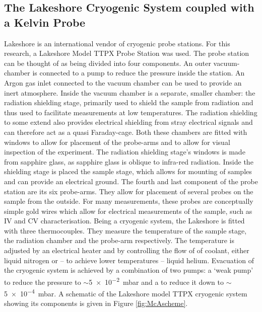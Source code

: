 \subsection{The Lakeshore Cryogenic System coupled with a \McA{} Kelvin Probe}
\label{sec:kpnew}
Lakeshore is an international vendor of cryogenic probe stations. For this research, a Lakeshore Model TTPX Probe Station was used. The probe station can be thought of as being divided into four components. An outer vacuum-chamber is connected to a pump to reduce the pressure inside the station. An Argon gas inlet connected to the vacuum chamber can be used to provide an inert atmosphere. Inside the vacuum chamber is a separate, smaller chamber: the radiation shielding stage, primarily used to shield the sample from \ir{} radiation and thus used to facilitate measurements at low temperatures. The radiation shielding to some extend also provides electrical shielding from stray electrical signals and can therefore act as a quasi Faraday-cage. Both these chambers are fitted with windows to allow for placement of the probe-arms and to allow for visual inspection of the experiment. The radiation shielding stage's windows is made from sapphire glass, as sapphire glass is oblique to infra-red radiation. Inside the shielding stage is placed the sample stage, which allows for mounting of samples and can provide an electrical ground. The fourth and last component of the probe station are its six probe-arms. They allow for placement of several probes on the sample from the outside. For many measurements, these probes are conceptually simple gold wires which allow for electrical measurements of the sample, such as IV and CV characterisation. Being a cryogenic system, the Lakeshore is fitted with three thermocouples. They measure the temperature of the sample stage, the radiation chamber and the probe-arm respectively. The temperature is adjusted by an electrical heater and by controlling the flow of of coolant, either liquid nitrogen or -- to achieve lower temperatures -- liquid helium. Evacuation of the cryogenic system is achieved by a combination of two pumps: a `weak pump' to reduce the pressure to $\sim$\SI{5e-2}{\milli\bar} and a  to reduce it down to $\sim$\SI{5e-4}{\milli\bar}. A schematic of the Lakeshore model TTPX cryogenic system showing its components is given in Figure \ref{fig:McAscheme}.\\
